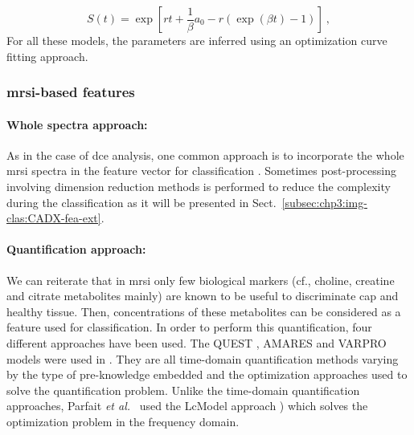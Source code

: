 
\begin{equation}
	S(t) = \exp \left[ r t + \frac{1}{\beta} a_0 - r \left( \exp( \beta t ) - 1 \right) \right] \ ,
	\label{eq:pun}
\end{equation}
\noindent For all these models, the parameters are inferred using an optimization curve fitting approach.


\subsubsection{\Ac{mrsi}-based features}\label{subsubsec:chp3:img-clas:CADX-fea-dec:MRSI-fea}

\paragraph{Whole spectra approach:}
As in the case of \ac{dce} analysis, one common approach is to incorporate the whole \ac{mrsi} spectra in the feature vector for classification \cite{Kelm2007,Parfait2012,Tiwari2007,Tiwari2009,Tiwari2013,Tiwari2009a,Tiwari2010,Viswanath2008a,Matulewicz2013}. 
Sometimes post-processing involving dimension reduction methods is performed to reduce the complexity during the classification as it will be presented in Sect.~\ref{subsec:chp3:img-clas:CADX-fea-ext}.

\paragraph{Quantification approach:}
We can reiterate that in \ac{mrsi} only few biological markers (cf., choline, creatine and citrate metabolites mainly) are known to be useful to discriminate \ac{cap} and healthy tissue.
Then, concentrations of these metabolites can be considered as a feature used for classification.
In order to perform this quantification, four different approaches have been used.
The QUEST \cite{Ratiney2005}, AMARES \cite{Vanhamme1997} and VARPRO \cite{Coleman1993} models were used in \cite{Kelm2007}.
They are all time-domain quantification methods varying by the type of pre-knowledge embedded and the optimization approaches used to solve the quantification problem.
Unlike the time-domain quantification approaches, Parfait \textit{et al.}~\cite{Parfait2012} used the LcModel approach \cite{Provencher1993}) which solves the optimization problem in the frequency domain.

